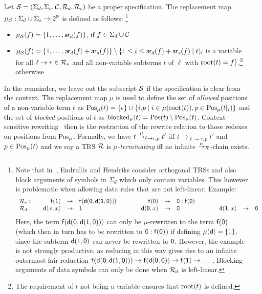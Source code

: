 \documentclass{eptcs}
\begin{document}
\begin{definition}
\label{def:Mu}
Let $\mathcal{S} = (\Sigma_d,\Sigma_s,\mathcal{C},\mathcal{R}_d,\mathcal{R}_s)$ be a proper specification.
The replacement map $\mu_{\mathcal{S}} : \Sigma_d \cup \Sigma_s \to 2^{\mathbb{N}}$
is defined as follows:
\footnote{
Note that in~\cite{EH11}, Endrullis and Hendriks consider orthogonal TRSs and
also block arguments of symbols in $\Sigma_d$ which only contain variables.
This however is problematic when allowing data rules that are not left-linear.
Example:
\[
\begin{array}{l@{\qquad}rcl@{\qquad\qquad}rcl@{\qquad\qquad}rcl}
\R_s:&
\fsym{f}(\fsym{1}) &\to&\fsym{f}(\fsym{d}(\fsym{0},\fsym{d}(\fsym{1},\fsym{0})))
&
\fsym{f}(\fsym{0}) &\to&  \fsym{0} : \fsym{f}(\fsym{0})
\\
\R_d:&
\fsym{d}(x,x) &\to& \fsym{1}
&
\fsym{d}(\fsym{0},x) &\to& \fsym{0}
&
\fsym{d}(\fsym{1},x) &\to& \fsym{0}
\end{array}
\]
Here, the term $\mathsf{f}(\mathsf{d}(\mathsf{0},\mathsf{d}(\mathsf{1},\mathsf{0})))$ can
only be $\mu$-rewritten to the term $\mathsf{f}(\mathsf{0})$ (which then in turn has
to be rewritten to $\mathsf{0} : \mathsf{f}(\mathsf{0})$)
if defining $\mu(\mathsf{d}) = \{ 1 \}$, since the subterm
$\mathsf{d}(\mathsf{1},\mathsf{0})$ can never be rewritten to $\mathsf{0}$. However, the
example is not strongly productive, as reducing in this way gives rise to an
infinite outermost-fair reduction
$
\mathsf{f}(\mathsf{d}(\mathsf{0},\mathsf{d}(\mathsf{1},\mathsf{0})))
\to
\mathsf{f}(\mathsf{d}(\mathsf{0},\mathsf{0}))
\to
\mathsf{f}(\mathsf{1})
\to
\dots
$.
Blocking arguments of data symbols can only be done when $\mathcal{R}_d$ is
left-linear.
}
\begin{itemize}
\item
$\mu_{\mathcal{S}}(f) = \{ 1, \dotsc, \mathsf{ar}_d(f) \}$, if $f \in \Sigma_d \cup \mathcal{C}$

\item
$\mu_{\mathcal{S}}(f) = \{ 1, \dotsc, \mathsf{ar}_d(f) + \mathsf{ar}_s(f) \}
    \setminus
    \{
        1 \le i \le \mathsf{ar}_d(f) + \mathsf{ar}_s(f)
        \mid
        t|_i$ is a variable
        for all $\ell \to r \in \mathcal{R}_s$
        and all non-variable subterms $t$ of $\ell$ with $\mathrm{root}(t) = f
    \}$,\footnote{
        The requirement of $t$ not being a variable ensures that
        $\mathrm{root}(t)$ is defined.
    }
    otherwise
\end{itemize}
\end{definition}

In the remainder, we leave out the subscript $\mathcal{S}$ if the specification is
clear from the context. The replacement map $\mu$ is used to define
the set of \emph{allowed} positions of a non-variable term $t$ as
$\mathrm{Pos}_\mu(t) = \{ \epsilon \} \cup
    \{ i.p \mid i \in \mu(\mathrm{root}(t)), p \in \mathrm{Pos}_\mu(t|_i) \}$
and the set of \emph{blocked} positions of $t$ as
$\mathrm{blocked}_{\mu}(t) = \mathrm{Pos}(t) \setminus \mathrm{Pos}_\mu(t)$.
Context-sensitive rewriting~\cite{L98} then
is the restriction of the rewrite relation to those redexes on positions
from $\mathrm{Pos}_\mu$. Formally, we have $t \mathrel{\smash{\overset{\mu}{\rightarrow}}}_{\ell \to r,p} t'$ iff
$t \to_{\ell \to r,p} t'$ and $p \in \mathrm{Pos}_\mu(t)$ and we say a TRS $\mathcal{R}$ is
\emph{$\mu$-terminating} iff no infinite $\mathrel{\smash{\overset{\mu}{\rightarrow}}}_{\mathcal{R}}$-chain exists.
\end{document}
